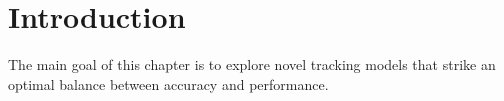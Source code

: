 
\section{Introduction} \label{sec:hmodel-intro}

%




The main goal of this chapter is to explore novel tracking models that strike an optimal balance between accuracy and performance.

